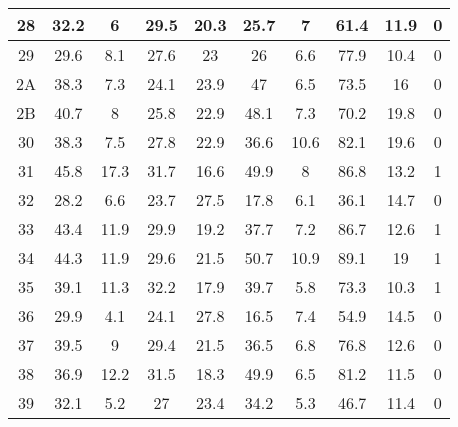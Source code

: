 \begin{longtable} {|c|c|c|c|c|c|c|c|c|c|}
28                            &        32.2&           6&        29.5&        20.3&        25.7&           7&        61.4&        11.9&           0\\\hline
29                            &        29.6&         8.1&        27.6&          23&          26&         6.6&        77.9&        10.4&           0\\\hline
2A                            &        38.3&         7.3&        24.1&        23.9&          47&         6.5&        73.5&          16&           0\\\hline
2B                            &        40.7&           8&        25.8&        22.9&        48.1&         7.3&        70.2&        19.8&           0\\\hline
30                            &        38.3&         7.5&        27.8&        22.9&        36.6&        10.6&        82.1&        19.6&           0\\\hline
31                            &        45.8&        17.3&        31.7&        16.6&        49.9&           8&        86.8&        13.2&           1\\\hline
32                            &        28.2&         6.6&        23.7&        27.5&        17.8&         6.1&        36.1&        14.7&           0\\\hline
33                            &        43.4&        11.9&        29.9&        19.2&        37.7&         7.2&        86.7&        12.6&           1\\\hline
34                            &        44.3&        11.9&        29.6&        21.5&        50.7&        10.9&        89.1&          19&           1\\\hline
35                            &        39.1&        11.3&        32.2&        17.9&        39.7&         5.8&        73.3&        10.3&           1\\\hline
36                            &        29.9&         4.1&        24.1&        27.8&        16.5&         7.4&        54.9&        14.5&           0\\\hline
37                            &        39.5&           9&        29.4&        21.5&        36.5&         6.8&        76.8&        12.6&           0\\\hline
38                            &        36.9&        12.2&        31.5&        18.3&        49.9&         6.5&        81.2&        11.5&           0\\\hline
39                            &        32.1&         5.2&          27&        23.4&        34.2&         5.3&        46.7&        11.4&           0\\\hline

\end{longtable}
